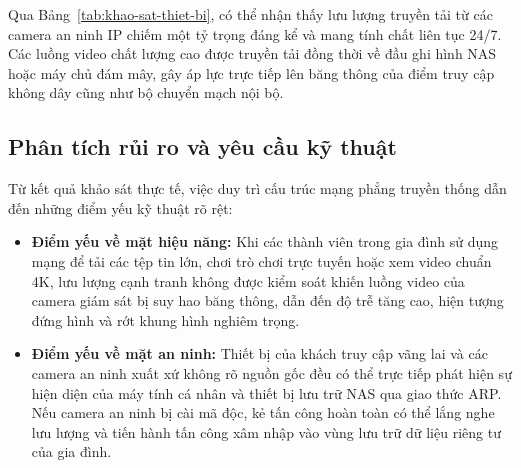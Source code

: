 Qua Bảng~\ref{tab:khao-sat-thiet-bi}, có thể nhận thấy lưu lượng truyền tải từ các camera an ninh IP chiếm một tỷ trọng đáng kể và mang tính chất liên tục 24/7. Các luồng video chất lượng cao được truyền tải đồng thời về đầu ghi hình NAS hoặc máy chủ đám mây, gây áp lực trực tiếp lên băng thông của điểm truy cập không dây cũng như bộ chuyển mạch nội bộ.

\subsection{Phân tích rủi ro và yêu cầu kỹ thuật}
\label{subsec:phan-tich-rui-ro-yeu-cau}

Từ kết quả khảo sát thực tế, việc duy trì cấu trúc mạng phẳng truyền thống dẫn đến những điểm yếu kỹ thuật rõ rệt:
\begin{itemize}
    \item \textbf{Điểm yếu về mặt hiệu năng:} Khi các thành viên trong gia đình sử dụng mạng để tải các tệp tin lớn, chơi trò chơi trực tuyến hoặc xem video chuẩn 4K, lưu lượng cạnh tranh không được kiểm soát khiến luồng video của camera giám sát bị suy hao băng thông, dẫn đến độ trễ tăng cao, hiện tượng đứng hình và rớt khung hình nghiêm trọng.
    \item \textbf{Điểm yếu về mặt an ninh:} Thiết bị của khách truy cập vãng lai và các camera an ninh xuất xứ không rõ nguồn gốc đều có thể trực tiếp phát hiện sự hiện diện của máy tính cá nhân và thiết bị lưu trữ NAS qua giao thức ARP. Nếu camera an ninh bị cài mã độc, kẻ tấn công hoàn toàn có thể lắng nghe lưu lượng và tiến hành tấn công xâm nhập vào vùng lưu trữ dữ liệu riêng tư của gia đình.
\end{itemize}

